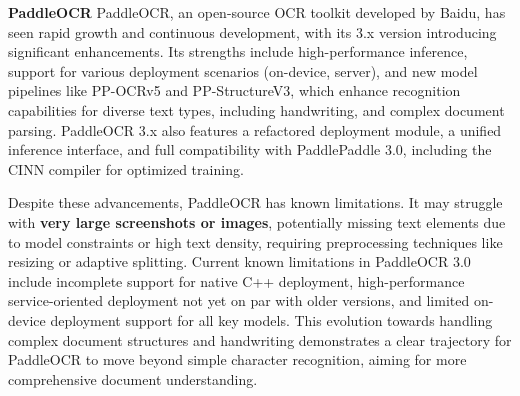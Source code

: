 \textbf{PaddleOCR}
PaddleOCR, an open-source OCR toolkit developed by Baidu, has seen rapid growth and continuous development, with its 3.x version introducing significant enhancements. Its strengths include high-performance inference, support for various deployment scenarios (on-device, server), and new model pipelines like PP-OCRv5 and PP-StructureV3, which enhance recognition capabilities for diverse text types, including handwriting, and complex document parsing. PaddleOCR 3.x also features a refactored deployment module, a unified inference interface, and full compatibility with PaddlePaddle 3.0, including the CINN compiler for optimized training.

Despite these advancements, PaddleOCR has known limitations. It may struggle with \textbf{very large screenshots or images}, potentially missing text elements due to model constraints or high text density, requiring preprocessing techniques like resizing or adaptive splitting. Current known limitations in PaddleOCR 3.0 include incomplete support for native C++ deployment, high-performance service-oriented deployment not yet on par with older versions, and limited on-device deployment support for all key models. This evolution towards handling complex document structures and handwriting demonstrates a clear trajectory for PaddleOCR to move beyond simple character recognition, aiming for more comprehensive document understanding.

